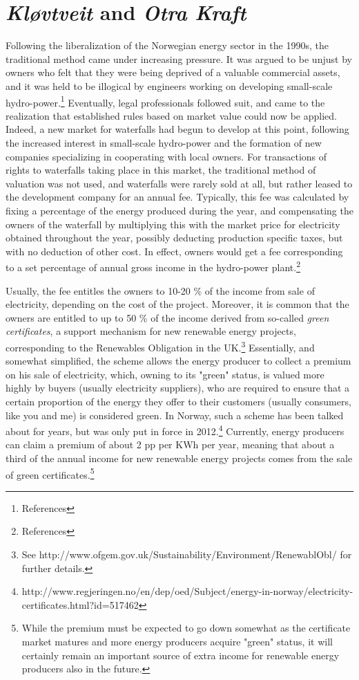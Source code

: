 \section{{\it Kløvtveit} and {\it Otra Kraft}}

Following the liberalization of the Norwegian energy sector in the 1990s, the traditional method came under increasing pressure. It was argued to be unjust by owners who felt that they were being deprived of a valuable commercial assets, and it was held to be illogical by engineers working on developing small-scale hydro-power.\footnote{References} Eventually, legal professionals followed suit, and came to the realization that established rules based on market value could now be applied. Indeed, a new market for waterfalls had begun to develop at this point, following the increased interest in small-scale hydro-power and the formation of new companies specializing in cooperating with local owners. For transactions of rights to waterfalls taking place in this market, the traditional method of valuation was not used, and waterfalls were rarely sold at all, but rather leased to the development company for an annual fee. Typically, this fee was calculated by fixing a percentage of the energy produced during the year, and compensating the owners of the waterfall by multiplying this with the market price for electricity obtained throughout the year, possibly deducting production specific taxes, but with no deduction of other cost. In effect, owners would get a fee corresponding to a set percentage of annual gross income in the hydro-power plant.\footnote{References}

Usually, the fee entitles the owners to 10-20 \% of the income from sale of electricity, depending on the cost of the project. Moreover, it is common that the owners are entitled to up to 50 \% of the income derived from so-called \emph{green certificates}, a support mechanism for new renewable energy projects, corresponding to the Renewables Obligation in the UK.\footnote{See http://www.ofgem.gov.uk/Sustainability/Environment/RenewablObl/ for further details.} Essentially, and somewhat simplified, the scheme allows the energy producer to collect a premium on his sale of electricity, which, owning to its "green" status, is valued more highly by buyers (usually electricity suppliers), who are required to ensure that a certain proportion of the energy they offer to their customers (usually consumers, like you and me) is considered green. In Norway, such a scheme has been talked about for years, but was only put in force in 2012.\footnote{http://www.regjeringen.no/en/dep/oed/Subject/energy-in-norway/electricity-certificates.html?id=517462} Currently, energy producers can claim a premium of about 2 pp per KWh per year, meaning that about a third of the annual income for new renewable energy projects comes from the sale of green certificates.\footnote{While the premium must be expected to go down somewhat as the certificate market matures and more energy producers acquire "green" status, it will certainly remain an important source of extra income for renewable energy producers also in the future.}

